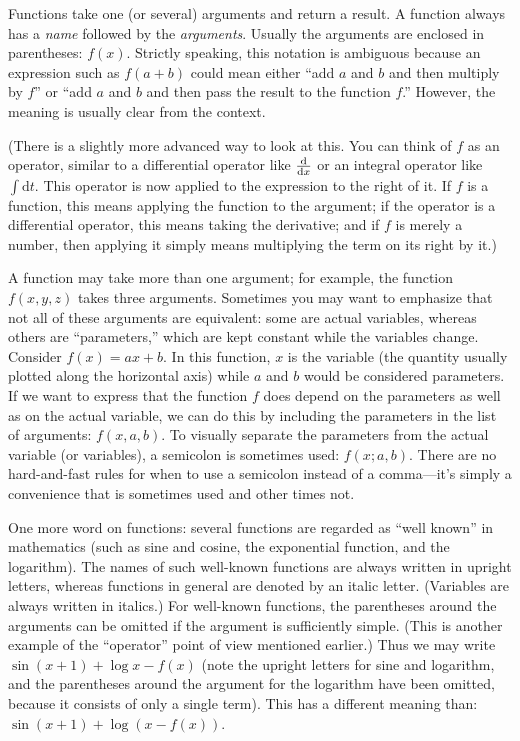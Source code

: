 Functions take one (or several) arguments and return a result. A
function always has a \emph{name} followed by the \emph{arguments}.
Usually the arguments are enclosed in parentheses: $f(x)$. Strictly
speaking, this notation is ambiguous because an expression such as
$f(a+b)$ could mean either ``add $a$ and $b$ and then multiply by
$f$'' or ``add $a$ and $b$ and then pass the result to the function
$f$.'' However, the meaning is usually clear from the context.

(There is a slightly more advanced way to look at this. You can think
of $f$ as an operator, similar to a differential operator like
$\frac{\rm d}{{\rm d} x}$ or an integral operator like $\int
\text{d}t$. This operator is now\vadjust{\pagebreak} applied to the expression to the
right of it. If $f$ is a function, this means applying the function to
the argument; if the operator is a differential operator, this means
taking the derivative; and if $f$ is merely a number, then applying it
simply means multiplying the term on its right by it.)

A function may take more than one argument; for example, the function
$f(x,y,z)$ takes three arguments. Sometimes you may want to emphasize
that not all of these arguments are equivalent: some are actual
variables, whereas others are ``parameters,'' which are kept constant
while the variables change. Consider $f(x) = a x + b$. In this
function, $x$ is the variable (the quantity usually plotted along the
horizontal axis) while $a$ and $b$ would be considered parameters.  If
we want to express that the function $f$ does depend on the parameters
as well as on the actual variable, we can do this by including the
parameters in the list of arguments: $f(x,a,b)$. To visually separate
the parameters from the actual variable (or variables), a semicolon is
sometimes used: $f(x;a,b)$.  There are no hard-and-fast rules for when
to use a semicolon instead of a comma---it's simply a convenience that
is sometimes used and other times not.

One more word on functions: several functions are regarded as ``well
known'' in mathematics (such as sine and cosine, the exponential
function, and the logarithm). The names of such well-known functions
are always written in upright letters, whereas functions in general
are denoted by an italic letter.  (Variables are always written in
italics.) For well-known functions, the parentheses around the
arguments can be omitted if the argument is sufficiently simple. (This
is another example of the ``operator'' point of view mentioned
earlier.) Thus we may write $\sin(x+1) + \log x - f(x)$ (note the
upright letters for sine and logarithm, and the parentheses around the
argument for the logarithm have been omitted, because it consists of
only a single term).  This has a different meaning than: $\sin(x+1) +
\log( x - f(x) )$.

